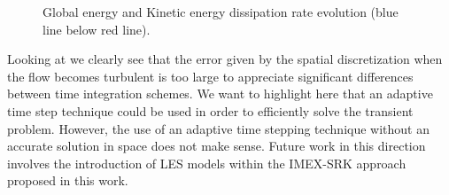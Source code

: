 \begin{figure}[h!]
  \centering
  \caption{Global energy and Kinetic energy dissipation rate evolution (blue line below red line).}
  \label{fig-TGV_ene_ens}
\end{figure}

Looking at  we clearly see that the error given by the spatial discretization when the flow becomes turbulent is too large to appreciate significant differences between time integration schemes. We want to highlight here that an adaptive time step technique could be used in order to efficiently solve the transient problem. However, the use of an adaptive time stepping technique without an accurate solution in space does not make sense. Future work in this direction involves the introduction of LES models within the IMEX-SRK approach proposed in this work.


